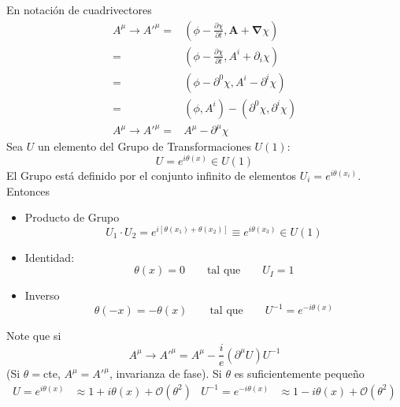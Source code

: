 En notaci\'on de cuadrivectores
\begin{align}
  A^\mu\to {A'}^\mu=&\left(\phi-\frac{\partial\chi}{\partial t},\mathbf{A}+\boldsymbol{\nabla}\chi
  \right)\nonumber\\
  =&\left(\phi-\frac{\partial\chi}{\partial t},A^{i}+\partial_i\chi
  \right)\nonumber\\
  =&\left(\phi-\partial^0\chi,A^{i}-\partial^{i}\chi
  \right)\nonumber\\
  =&\left(\phi,A^{i}
  \right)-
  \left(
    \partial^0\chi,\partial^{i}\chi
  \right)\nonumber\\
  \label{eq:aphicov}
  A^\mu\to {A'}^\mu=&A^\mu-\partial^\mu\chi
\end{align}
Sea  $U$ un elemento del Grupo de Transformaciones  $U(1)$:
\begin{equation}
  \label{eq:u1ele}
  U=e^{i\theta(x)}\in U(1)
\end{equation}
El Grupo est\'a definido por el conjunto infinito de elementos $U_i=e^{i\theta(x_i)}$. Entonces
\begin{itemize} %
\item Producto de Grupo 
  \begin{equation*}
      U_1\cdot U_2=e^{i[\theta(x_1)+\theta(x_2)]}\equiv e^{i\theta(x_3)}\in U(1)
  \end{equation*}
\item Identidad: 
  \begin{equation*}
  \theta(x)=0\qquad \text{tal que}\qquad U_I=1  
  \end{equation*}
\item Inverso 
  \begin{equation*}
      \theta(-x)=-\theta(x)\qquad \text{tal que}\qquad U^{-1}=e^{-i\theta(x)}
  \end{equation*}
\end{itemize} %
Note que si
\begin{equation}
  \label{eq:amutransf}
  A^\mu\to{A'}^\mu=A^\mu-\frac{i}{e}(\partial^\mu U)U^{-1}
\end{equation}
(Si $\theta=$cte, $ A^\mu={A'}^\mu$, invarianza de fase). Si $\theta$ es suficientemente peque\~no
\begin{align}
  \label{eq:Uinf}
  U=e^{i\theta(x)}&\approx1+i\theta(x)+\mathcal{O}(\theta^2)&U^{-1}=e^{-i\theta(x)}&\approx1-i\theta(x)+\mathcal{O}(\theta^2)
\end{align}
